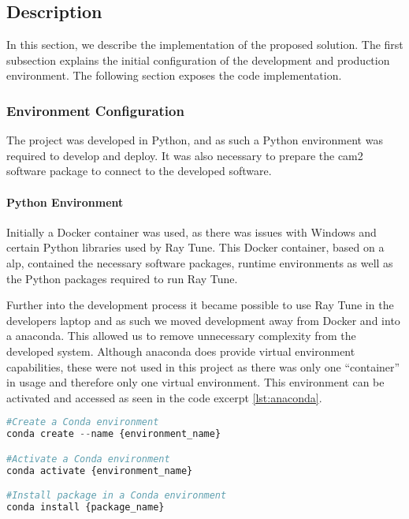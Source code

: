 
\subsection{Description}

In this section, we describe the implementation of the proposed solution. The first subsection explains the initial configuration of the development and production environment. The following section exposes the code implementation.

\subsubsection{Environment Configuration}

The project was developed in Python, and as such a Python environment was required to develop and deploy. It was also necessary to prepare the \acrshort{cam2} software package to connect to the developed software.

\paragraph{Python Environment}

Initially a Docker container was used, as there was issues with Windows and certain Python libraries used by Ray Tune. This Docker container, based on a \acrfull{alp}, contained the necessary software packages, runtime environments as well as the Python packages required to run Ray Tune.

Further into the development process it became possible to use Ray Tune in the developers laptop and as such we moved development away from Docker and into a \acrfull{anaconda}. This allowed us to remove unnecessary complexity from the developed system. Although \acrshort{anaconda} does provide virtual environment capabilities, these were not used in this project as there was only one ``container'' in usage and therefore only one virtual environment. This environment can be activated and accessed as seen in the code excerpt \ref{lst:anaconda}.

\begin{lstlisting}[language=Python, caption=Managing a Conda environment, captionpos=b, label={lst:anaconda}]
#Create a Conda environment
conda create --name {environment_name}

#Activate a Conda environment
conda activate {environment_name}

#Install package in a Conda environment
conda install {package_name}
\end{lstlisting}

